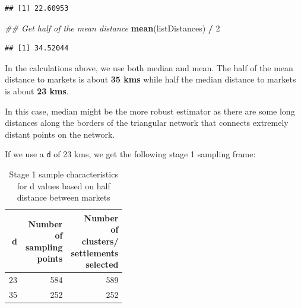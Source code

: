 \documentclass[
  12pt,
  a4paper]{article}
\newenvironment{Shaded}{\begin{snugshade}}{\end{snugshade}}
\newcommand{\CommentTok}[1]{\textcolor[rgb]{0.56,0.35,0.01}{\textit{#1}}}
\newcommand{\DecValTok}[1]{\textcolor[rgb]{0.00,0.00,0.81}{#1}}
\newcommand{\KeywordTok}[1]{\textcolor[rgb]{0.13,0.29,0.53}{\textbf{#1}}}
\newcommand{\NormalTok}[1]{#1}
\newcommand{\OperatorTok}[1]{\textcolor[rgb]{0.81,0.36,0.00}{\textbf{#1}}}
\newcommand{\StringTok}[1]{\textcolor[rgb]{0.31,0.60,0.02}{#1}}
\begin{document}
\begin{verbatim}
## [1] 22.60953
\end{verbatim}

\begin{Shaded}
\begin{Highlighting}[]
\CommentTok{## Get half of the mean distance}
\KeywordTok{mean}\NormalTok{(listDistances) }\OperatorTok{/}\StringTok{ }\DecValTok{2}
\end{Highlighting}
\end{Shaded}

\begin{verbatim}
## [1] 34.52044
\end{verbatim}

In the calculations above, we use both median and mean. The half of the mean distance to markets is about \textbf{35 kms} while half the median distance to markets is about \textbf{23 kms}.

In this case, median might be the more robust estimator as there are some long distances along the borders of the triangular network that connects extremely distant points on the network.

If we use a \texttt{d} of 23 kms, we get the following stage 1 sampling frame:

\begin{table}[H]

\caption{\label{tab:halfdist3}Stage 1 sample characteristics for d values based on half distance between markets}
\centering
\begin{tabular}[t]{rrr}
\toprule
d & \makecell[c]{Number\\of\\sampling\\points} & \makecell[c]{Number\\of\\clusters/\\settlements\\selected}\\
\midrule
\rowcolor{gray!6}  23 & 584 & 589\\
35 & 252 & 252\\
\bottomrule
\end{tabular}
\end{table}
\end{document}

